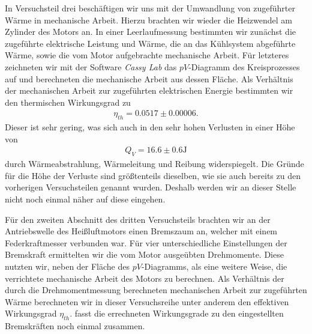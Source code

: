 In Versuchsteil drei beschäftigen wir uns mit der Umwandlung von zugeführter Wärme in mechanische Arbeit. Hierzu brachten wir wieder die Heizwendel am Zylinder des Motors an. In einer Leerlaufmessung bestimmten wir zunächst die zugeführte elektrische Leistung und Wärme, die an das Kühlsystem abgeführte Wärme, sowie die vom Motor aufgebrachte mechanische Arbeit. Für letzteres zeichneten wir mit der Software \textit{Cassy Lab} das $pV$-Diagramm des Kreisprozesses auf und berechneten die mechanische Arbeit aus dessen Fläche. Als Verhältnis der mechanischen Arbeit zur zugeführten elektrischen Energie bestimmten wir den thermischen Wirkungsgrad zu
\begin{align*}
  \eta_{th} = 0.0517 \pm 0.00006.
\end{align*}
Dieser ist sehr gering, was sich auch in den sehr hohen Verlusten in einer Höhe von
\begin{align*}
    Q_V = 16.6 \pm 0.6 \si{\joule}
\end{align*}
durch Wärmeabstrahlung, Wärmeleitung und Reibung widerspiegelt. Die Gründe für die Höhe der Verluste sind größtenteils dieselben, wie sie auch bereits zu den vorherigen Versuchsteilen genannt wurden. Deshalb werden wir an dieser Stelle nicht noch einmal näher auf diese eingehen.

Für den zweiten Abschnitt des dritten Versuchsteils brachten wir an der Antriebswelle des Heißluftmotors einen Bremszaum an, welcher mit einem Federkraftmesser verbunden war. Für vier unterschiedliche Einstellungen der Bremskraft ermittelten wir die vom Motor ausgeübten Drehmomente. Diese nutzten wir, neben der Fläche des $pV$-Diagramms, als eine weitere Weise, die verrichtete mechanische Arbeit des Motors zu berechnen. Als Verhältnis der durch die Drehmomentmessung berechneten mechanischen Arbeit zur zugeführten Wärme berechneten wir in dieser Versuchsreihe unter anderem den effektiven Wirkungsgrad $\eta_{th}$.  fasst die errechneten Wirkungsgrade zu den eingestellten Bremskräften noch einmal zusammen.

